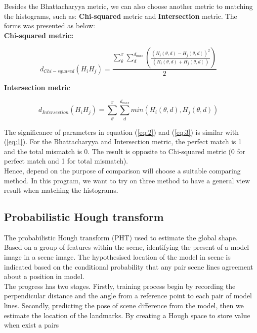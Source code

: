 Besides the Bhattacharyya metric, we can also choose another metric to matching the histograms, such as: \textbf{Chi-squared} metric and \textbf{Intersection} metric. The forms was presented as below:\\
\textbf{Chi-squared metric:}
\begin{center}
\begin{equation}\label{eq:2}
d_{Chi-squared} (H_{i}H_{j}) = \frac{\sum\limits_{\theta}^{\pi}\sum\limits_{d}^{d_{max}}(\frac{(H_{i}(\theta,d) - H_{j}(\theta,d))^{2}}{(H_{i}(\theta,d) + H_{j}(\theta,d))})}{2}
\end{equation}
\end{center}
\textbf{Intersection metric}
\begin{center}
\begin{equation}\label{eq:3}
d_{Intersection} (H_{i}H_{j}) = \sum\limits_{\theta}^{\pi}\sum\limits_{d}^{d_{max}}min(H_{i}(\theta,d), H_{j}(\theta,d))
\end{equation}
\end{center}
The significance of parameters in equation (\ref{eq:2}) and (\ref{eq:3}) is similar with (\ref{eq:1}). For the Bhattacharyya and Intersection metric, the perfect match is 1 and the total mismatch is 0. The result is opposite to Chi-squared metric (0 for perfect match and 1 for total mismatch).\\[0.2cm]
Hence, depend on the purpose of comparison will choose a suitable comparing method. In this program, we want to try on three method to have a general view result when matching the histograms.
\subsection{Probabilistic Hough transform}
The probabilistic Hough transform (PHT) used to estimate the global shape. Based on a group of features within the scene, identifying the present of a model image in a scene image. The hypothesised location of the model in scene is indicated based on the conditional probability that any pair scene lines agreement about a position in model.\\[0.3cm]
The progress has two stages. Firstly, training process begin by recording the perpendicular distance and the angle from a reference point to each pair of model lines. Secondly, predicting the pose of scene difference from the model, then we estimate the location of the landmarks. By creating a Hough space to store value when exist a pairs




